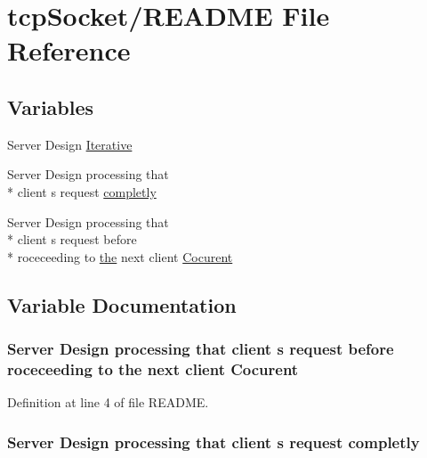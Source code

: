 \hypertarget{tcpSocket_2README}{\section{tcp\-Socket/\-R\-E\-A\-D\-M\-E File Reference}
\label{tcpSocket_2README}
}
\subsection*{Variables}
\begin{DoxyCompactItemize}
\item 
Server Design \hyperlink{tcpSocket_2README_a3652bdf2b1d82505530a3f0fae48505c}{Iterative}
\item 
Server Design processing that \\*
client s request \hyperlink{tcpSocket_2README_a25176105e88a72b92d4d66dccbccc2dc}{completly}
\item 
Server Design processing that \\*
client s request before \\*
roceceeding to \hyperlink{ClientServer_2server_2Makefile_a09c6b60bb7451f9136e25140ffdff6bd}{the} next client \hyperlink{tcpSocket_2README_a47da67c2ce0f5106f4d7c6b944cfa68a}{Cocurent}
\end{DoxyCompactItemize}


\subsection{Variable Documentation}
\hypertarget{tcpSocket_2README_a47da67c2ce0f5106f4d7c6b944cfa68a}{
\subsubsection[{Cocurent}]{\setlength{\rightskip}{0pt plus 5cm}Server Design processing that client s request before roceceeding to {\bf the} next client Cocurent}}\label{tcpSocket_2README_a47da67c2ce0f5106f4d7c6b944cfa68a}


Definition at line 4 of file R\-E\-A\-D\-M\-E.

\hypertarget{tcpSocket_2README_a25176105e88a72b92d4d66dccbccc2dc}{
\subsubsection[{completly}]{\setlength{\rightskip}{0pt plus 5cm}Server Design processing that client s request completly}}\label{tcpSocket_2README_a25176105e88a72b92d4d66dccbccc2dc}


